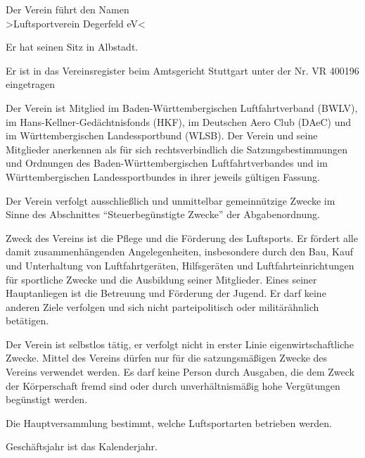 \documentclass[10pt,a4paper,parskip=half]{scrartcl}
\begin{document}
\begin{contract}
    
    Der Verein führt den Namen\\
    >Luftsportverein Degerfeld eV<
    
    Er hat seinen Sitz in Albstadt.
    
    Er ist in das Vereinsregister beim Amtsgericht Stuttgart unter der Nr. VR 400196 eingetragen
    
    Der Verein ist Mitglied im Ba\-den-Würt\-tem\-ber\-gischen Luftfahrt\-verband (BWLV),
    im Hans-Kellner-Gedächtnis\-fonds (HKF),
    im Deutschen Aero Club (DAeC) und im Würt\-tem\-ber\-gischen Landessportbund (WLSB).
    Der Verein und seine Mitglieder anerkennen als für sich rechtsverbindlich die Satzungsbestimmungen und Ordnungen des Baden-Württembergischen Luftfahrt\-verbandes und im Würt\-tem\-ber\-gischen Landes\-sport\-bundes in ihrer jeweils gültigen Fassung.
    
    Der Verein verfolgt ausschließlich und unmittelbar gemeinnützige Zwecke im Sinne des Abschnittes "`Steuerbegünstigte Zwecke"' der Abgabenordnung.
    
    Zweck des Vereins ist die Pflege und die Förderung des Luftsports.
    Er fördert alle damit zusammenhängenden Angelegenheiten,
    insbesondere durch den Bau,
    Kauf und Unterhaltung von Luftfahrtgeräten,
    Hilfsgeräten und Luftfahrteinrichtungen für sportliche Zwecke und die Ausbildung seiner Mitglieder.
    Eines seiner Hauptanliegen ist die Betreuung und Förderung der Jugend.
    Er darf keine anderen Ziele verfolgen und sich nicht parteipolitisch oder militärähnlich betätigen.
    
    Der Verein ist selbstlos tätig,
    er verfolgt nicht in erster Linie eigenwirtschaftliche Zwecke.
    Mittel des Vereins dürfen nur für die satzungsmäßigen Zwecke des Vereins verwendet werden. Es darf keine Person durch Ausgaben,
    die dem Zweck der Körperschaft fremd sind oder durch unverhältnismäßig hohe Vergütungen begünstigt werden.
    
    Die Hauptversammlung bestimmt,
    welche Luftsportarten betrieben werden.
    
    Geschäftsjahr ist das Kalenderjahr.
    

\end{contract}
\end{document}
